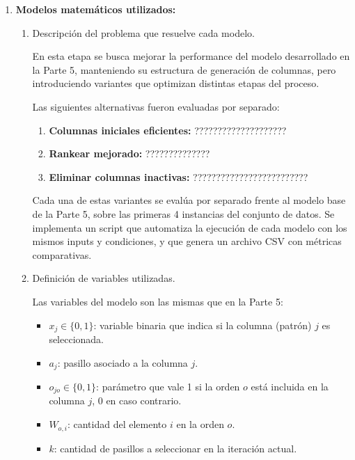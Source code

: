 \documentclass[a4paper,12pt]{article}
\begin{document}
\begin{enumerate}[label=(\alph*), leftmargin=2em]
    \item \textbf{Modelos matemáticos utilizados:}
    \begin{enumerate}[label=\roman*., leftmargin=0.2em]
    
        \item Descripción del problema que resuelve cada modelo.
        
            En esta etapa se busca mejorar la performance del modelo desarrollado en la Parte 5, manteniendo su estructura de generación de columnas, pero introduciendo variantes que optimizan distintas etapas del proceso. 

            Las siguientes alternativas fueron evaluadas por separado:

            \begin{enumerate}[label=\arabic*.]
                \item \textbf{Columnas iniciales eficientes:} ????????????????????
                \item \textbf{Rankear mejorado:} ??????????????
                \item \textbf{Eliminar columnas inactivas:} ?????????????????????????
            \end{enumerate}

            Cada una de estas variantes se evalúa por separado frente al modelo base de la Parte 5, sobre las primeras 4 instancias del conjunto de datos. Se implementa un script que automatiza la ejecución de cada modelo con los mismos inputs y condiciones, y que genera un archivo CSV con métricas comparativas.

        \item Definición de variables utilizadas.

            Las variables del modelo son las mismas que en la Parte 5:

            \begin{itemize}
                \item \(x_j \in \{0,1\}\): variable binaria que indica si la columna (patrón) \(j\) es seleccionada.
                \item \(a_j\): pasillo asociado a la columna \(j\).
                \item \(o_{jo} \in \{0,1\}\): parámetro que vale 1 si la orden \(o\) está incluida en la columna \(j\), 0 en caso contrario.
                \item \(W_{o,i}\): cantidad del elemento \(i\) en la orden \(o\).
                \item \(k\): cantidad de pasillos a seleccionar en la iteración actual.
            \end{itemize}


\end{enumerate}
\end{enumerate}
\end{document}
